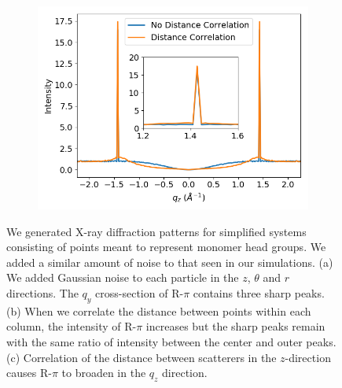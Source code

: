 \documentclass[journal=jpcbfk,manuscript=article]{achemso}
\begin{document}
\begin{figure}[!htb]
\begin{subfigure}{0.3\textwidth}
  \includegraphics[width=\textwidth]{sf_qz_correlation.png}
  \caption{}\label{fig:sf_qz_correlation}
  \end{subfigure}   
  \caption{We generated X-ray diffraction patterns for simplified systems consisting of 
  points meant to represent monomer head groups. We added a similar amount of noise to 
  that seen in our simulations. (a) We added Gaussian noise to each particle in the $z$, 
  $\theta$ and $r$ directions. The $q_y$ cross-section of R-$\pi$ contains three sharp
  peaks. (b) When we correlate the distance between points within each column, the 
  intensity of R-$\pi$ increases but the sharp peaks remain with the same ratio of
  intensity between the center and outer peaks. (c) Correlation of the distance between
  scatterers in the $z$-direction causes R-$\pi$ to broaden in the $q_z$ direction.}\label{fig:sf_correlation}
  \end{figure}
  
\end{document}
